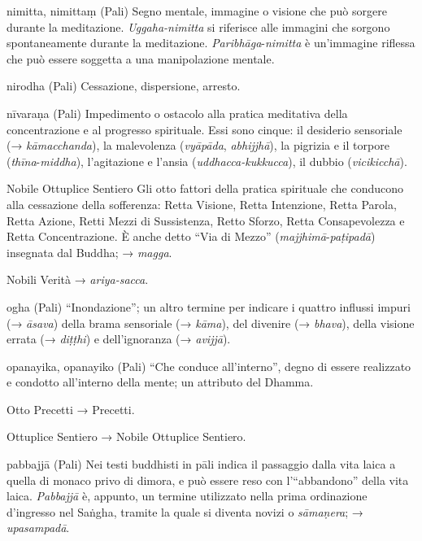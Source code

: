 \begin{glossarydescription}
\item[nimitta, nimittaṃ] (Pali) Segno mentale, immagine o visione che
può sorgere durante la meditazione. \emph{Uggaha-nimitta} si riferisce
alle immagini che sorgono spontaneamente durante la meditazione.
\emph{Paribhāga}-\emph{nimitta} è un'immagine riflessa che può essere
soggetta a una manipolazione mentale.

\item[nirodha] (Pali) Cessazione, dispersione, arresto.

\item[nīvaraṇa] (Pali) Impedimento o ostacolo alla pratica meditativa della
concentrazione e al progresso spirituale. Essi sono cinque: il desiderio
sensoriale (→ \emph{kāmacchanda}), la malevolenza (\emph{vyāpāda},
\emph{abhijjhā}), la pigrizia e il torpore (\emph{thīna}-\emph{middha}),
l'agitazione e l'ansia (\emph{uddhacca-kukkucca}), il dubbio
(\emph{vicikicchā}).

\item[Nobile Ottuplice Sentiero] Gli otto fattori della pratica spirituale che
conducono alla cessazione della sofferenza: Retta Visione, Retta
Intenzione, Retta Parola, Retta Azione, Retti Mezzi di Sussistenza,
Retto Sforzo, Retta Consapevolezza e Retta Concentrazione. È anche detto
``Via di Mezzo'' (\emph{majjhimā}-\emph{paṭipadā}) insegnata dal Buddha;
→ \emph{magga}.

\item[Nobili Verità] → \emph{ariya-sacca}.


\item[ogha] (Pali) ``Inondazione''; un altro termine per indicare i quattro
influssi impuri (→ \emph{āsava}) della brama sensoriale (→ \emph{kāma}),
del divenire (→ \emph{bhava}), della visione errata (→ \emph{diṭṭhi}) e
dell'ignoranza (→ \emph{avijjā}).

\item[opanayika, opanayiko] (Pali) ``Che conduce all'interno'', degno
di essere realizzato e condotto all'interno della mente; un attributo
del Dhamma.

\item[Otto Precetti] → Precetti.

\item[Ottuplice Sentiero] → Nobile Ottuplice Sentiero.


\item[pabbajjā] (Pali) Nei testi buddhisti in pāli indica il passaggio dalla
vita laica a quella di monaco privo di dimora, e può essere reso con
l'``abbandono'' della vita laica. \emph{Pabbajjā} è, appunto, un termine
utilizzato nella prima ordinazione d'ingresso nel Saṅgha, tramite la
quale si diventa novizi o \emph{sāmaṇera}; → \emph{upasampadā}.


\end{glossarydescription}
